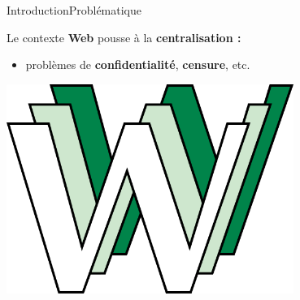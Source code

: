 \begin{frame}{Introduction}{Problématique}

  
  \begin{minipage}{0.69\textwidth}
    Le contexte \textbf{Web} pousse à la \textbf{centralisation :}
    \begin{itemize}
    \item problèmes de \textbf{confidentialité}, \textbf{censure}, etc.
    \end{itemize}
  \end{minipage}
  \hfill
  \begin{minipage}{0.3\textwidth}
    \includegraphics[width=0.7\textwidth]{img/www.png}
  \end{minipage}

  \vspace{0.5cm}
  


\end{frame}
